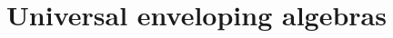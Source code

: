\documentclass{ximera}
\title{Universal enveloping algebras}
\begin{document}
\begin{abstract}

\end{abstract}
\maketitle

\end{document}
